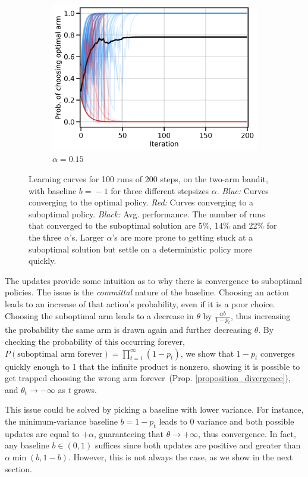 \begin{figure}[t!]
\begin{subfigure}[b]{0.32\linewidth}
    \includegraphics[width=\textwidth]{articles/baselines/figs/paper/bandit_committal_015.png}
    \caption{$\alpha=0.15$}
\end{subfigure}

\caption{Learning curves for 100 runs of 200 steps, on the two-arm bandit, with baseline $b\!=\!-1$ for three different stepsizes $\alpha$. \emph{Blue:} Curves converging to the optimal policy. \emph{Red:} Curves  converging to a suboptimal policy. \emph{Black:} Avg. performance. 
The number of runs that converged to the suboptimal solution are 5\%, 14\% and 22\% for the three $\alpha$'s. Larger $\alpha$'s are more prone to getting stuck at a suboptimal solution but settle on a deterministic policy more quickly.}
\label{fig:divergence_2arm_bandit}
\end{figure}

The updates provide some intuition as to why there is convergence to suboptimal policies. The issue is the \textit{committal} nature of the baseline. Choosing an action leads to an increase of that action's probability, even if it is a poor choice. Choosing the suboptimal arm leads to a decrease in $\theta$ by $\tfrac{\alpha b}{1-p_t}$, thus increasing the probability the same arm is drawn again and further decreasing $\theta$. By checking the probability of this occurring forever, $P(\text{suboptimal arm forever}) = \prod_{t=1}^\infty (1-p_t)$, we show that $1-p_t$ converges quickly enough to 1 that the infinite product is nonzero, showing it is possible to get trapped choosing the wrong arm forever~(Prop. \ref{proposition_divergence}), and $\theta_t \to -\infty$ as $t$ grows.

This issue could be solved by picking a baseline with lower variance. For instance, the minimum-variance baseline $b = 1 - p_t$ leads to $0$ variance and both possible updates are equal to $+\alpha$, guaranteeing that $\theta \to +\infty$, thus convergence. In fact, any baseline $b \in (0,1)$ suffices since both updates are positive and greater than $\alpha \min(b, 1-b)$. However, this is not always the case, as we show in the next section.

